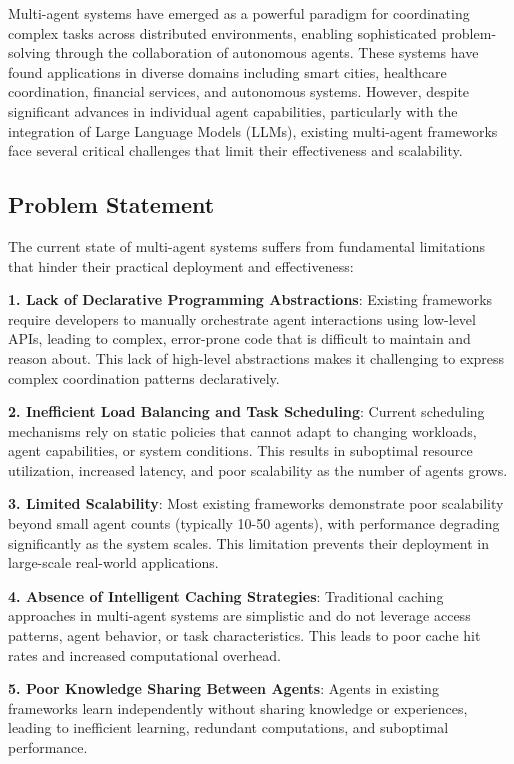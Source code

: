 \documentclass[conference]{IEEEtran}
\begin{document}
Multi-agent systems have emerged as a powerful paradigm for coordinating complex tasks across distributed environments, enabling sophisticated problem-solving through the collaboration of autonomous agents. These systems have found applications in diverse domains including smart cities, healthcare coordination, financial services, and autonomous systems. However, despite significant advances in individual agent capabilities, particularly with the integration of Large Language Models (LLMs), existing multi-agent frameworks face several critical challenges that limit their effectiveness and scalability.

\subsection{Problem Statement}

The current state of multi-agent systems suffers from fundamental limitations that hinder their practical deployment and effectiveness:

\textbf{1. Lack of Declarative Programming Abstractions}: Existing frameworks require developers to manually orchestrate agent interactions using low-level APIs, leading to complex, error-prone code that is difficult to maintain and reason about. This lack of high-level abstractions makes it challenging to express complex coordination patterns declaratively.

\textbf{2. Inefficient Load Balancing and Task Scheduling}: Current scheduling mechanisms rely on static policies that cannot adapt to changing workloads, agent capabilities, or system conditions. This results in suboptimal resource utilization, increased latency, and poor scalability as the number of agents grows.

\textbf{3. Limited Scalability}: Most existing frameworks demonstrate poor scalability beyond small agent counts (typically 10-50 agents), with performance degrading significantly as the system scales. This limitation prevents their deployment in large-scale real-world applications.

\textbf{4. Absence of Intelligent Caching Strategies}: Traditional caching approaches in multi-agent systems are simplistic and do not leverage access patterns, agent behavior, or task characteristics. This leads to poor cache hit rates and increased computational overhead.

\textbf{5. Poor Knowledge Sharing Between Agents}: Agents in existing frameworks learn independently without sharing knowledge or experiences, leading to inefficient learning, redundant computations, and suboptimal performance.
\end{document}
